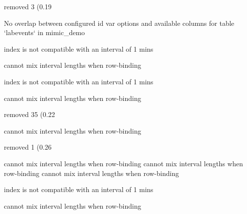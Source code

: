 \documentclass[
]{jss}
\begin{document}
\begin{CodeChunk}
\begin{CodeOutput}
removed 3 (0.19%
\end{CodeOutput}

\begin{CodeOutput}
No overlap between configured id var options and available columns for table
`labevents` in mimic_demo
\end{CodeOutput}

\begin{CodeOutput}
index is not compatible with an interval of 1 mins
\end{CodeOutput}

\begin{CodeOutput}
cannot mix interval lengths when row-binding
\end{CodeOutput}

\begin{CodeOutput}
index is not compatible with an interval of 1 mins
\end{CodeOutput}

\begin{CodeOutput}
cannot mix interval lengths when row-binding
\end{CodeOutput}

\begin{CodeOutput}
removed 35 (0.22%
\end{CodeOutput}

\begin{CodeOutput}
cannot mix interval lengths when row-binding
\end{CodeOutput}

\begin{CodeOutput}
removed 1 (0.26%
\end{CodeOutput}

\begin{CodeOutput}
cannot mix interval lengths when row-binding
cannot mix interval lengths when row-binding
cannot mix interval lengths when row-binding
\end{CodeOutput}

\begin{CodeOutput}
index is not compatible with an interval of 1 mins
\end{CodeOutput}

\begin{CodeOutput}
cannot mix interval lengths when row-binding
\end{CodeOutput}


\end{CodeChunk}
\end{document}
